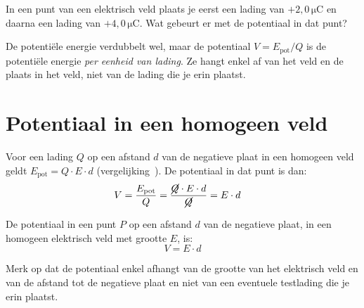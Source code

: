 \documentclass{ximera}
\begin{document}
\begin{question}
    In een punt van een elektrisch veld plaats je eerst een lading van $+2{,}0 \, \mathrm{\mu C}$ en daarna een lading van $+4{,}0 \, \mathrm{\mu C}$. Wat gebeurt er met de potentiaal in dat punt?

    \begin{multipleChoice}
    \end{multipleChoice}

    \begin{solution}\nl
        De potentiële energie verdubbelt wel, maar de potentiaal $V = E_{\text{pot}}/Q$ is de potentiële energie \emph{per eenheid van lading}. Ze hangt enkel af van het veld en de plaats in het veld, niet van de lading die je erin plaatst.
    \end{solution}
\end{question}

\section{Potentiaal in een homogeen veld}
Voor een lading $Q$ op een afstand $d$ van de negatieve plaat in een homogeen veld geldt $E_{\text{pot}} = Q \cdot E \cdot d$ (vergelijking~). De potentiaal in dat punt is dan:
\begin{align*}
    V &= \frac{E_{\text{pot}}}{Q} = \frac{\cancel{Q} \cdot E \cdot d}{\cancel{Q}} = E \cdot d
\end{align*}

\begin{proposition}[foldable=true,title={Potentiaal in een homogeen veld}]\nl
De potentiaal in een punt $P$ op een afstand $d$ van de negatieve plaat, in een homogeen elektrisch veld met grootte $E$, is:
\begin{equation}\label{eq:potentiaal_homogeen}
    V = E \cdot d
\end{equation}
\end{proposition}

Merk op dat de potentiaal enkel afhangt van de grootte van het elektrisch veld en van de afstand tot de negatieve plaat en niet van een eventuele testlading die je erin plaatst.
\end{document}
